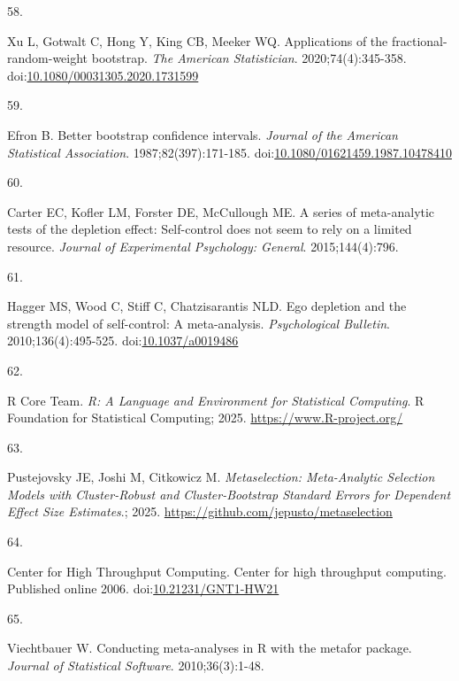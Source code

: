 \documentclass[
  american,
  man, donotrepeattitle,floatsintext]{apa7}
\newlength{\cslhangindent}
\newlength{\csllabelwidth}
\newenvironment{CSLReferences}[2] %
 {\begin{list}{}{%
  \setlength{\itemindent}{0pt}
  \setlength{\leftmargin}{0pt}
  \setlength{\parsep}{0pt}
  \ifodd #1
   \setlength{\leftmargin}{\cslhangindent}
   \setlength{\itemindent}{-1\cslhangindent}
  \fi
  \setlength{\itemsep}{#2\baselineskip}}}
 {\end{list}}
\newcommand{\CSLLeftMargin}[1]{\parbox[t]{\csllabelwidth}{\strut#1\strut}}
\newcommand{\CSLRightInline}[1]{\parbox[t]{\linewidth - \csllabelwidth}{\strut#1\strut}}
\begin{document}
\begin{CSLReferences}{0}{1}
\CSLLeftMargin{58. }%
\CSLRightInline{Xu L, Gotwalt C, Hong Y, King CB, Meeker WQ. Applications of the fractional-random-weight bootstrap. \emph{The American Statistician}. 2020;74(4):345-358. doi:\href{https://doi.org/10.1080/00031305.2020.1731599}{10.1080/00031305.2020.1731599}}

\CSLLeftMargin{59. }%
\CSLRightInline{Efron B. Better bootstrap confidence intervals. \emph{Journal of the American Statistical Association}. 1987;82(397):171-185. doi:\href{https://doi.org/10.1080/01621459.1987.10478410}{10.1080/01621459.1987.10478410}}

\CSLLeftMargin{60. }%
\CSLRightInline{Carter EC, Kofler LM, Forster DE, McCullough ME. A series of meta-analytic tests of the depletion effect: Self-control does not seem to rely on a limited resource. \emph{Journal of Experimental Psychology: General}. 2015;144(4):796.}

\CSLLeftMargin{61. }%
\CSLRightInline{Hagger MS, Wood C, Stiff C, Chatzisarantis NLD. Ego depletion and the strength model of self-control: {A} meta-analysis. \emph{Psychological Bulletin}. 2010;136(4):495-525. doi:\href{https://doi.org/10.1037/a0019486}{10.1037/a0019486}}

\CSLLeftMargin{62. }%
\CSLRightInline{R Core Team. \emph{R: A Language and Environment for Statistical Computing}. R Foundation for Statistical Computing; 2025. \url{https://www.R-project.org/}}

\CSLLeftMargin{63. }%
\CSLRightInline{Pustejovsky JE, Joshi M, Citkowicz M. \emph{Metaselection: Meta-Analytic Selection Models with Cluster-Robust and Cluster-Bootstrap Standard Errors for Dependent Effect Size Estimates}.; 2025. \url{https://github.com/jepusto/metaselection}}

\CSLLeftMargin{64. }%
\CSLRightInline{Center for High Throughput Computing. Center for high throughput computing. Published online 2006. doi:\href{https://doi.org/10.21231/GNT1-HW21}{10.21231/GNT1-HW21}}

\CSLLeftMargin{65. }%
\CSLRightInline{Viechtbauer W. {Conducting meta-analyses in R with the metafor package}. \emph{Journal of Statistical Software}. 2010;36(3):1-48.}


\end{CSLReferences}
\end{document}
